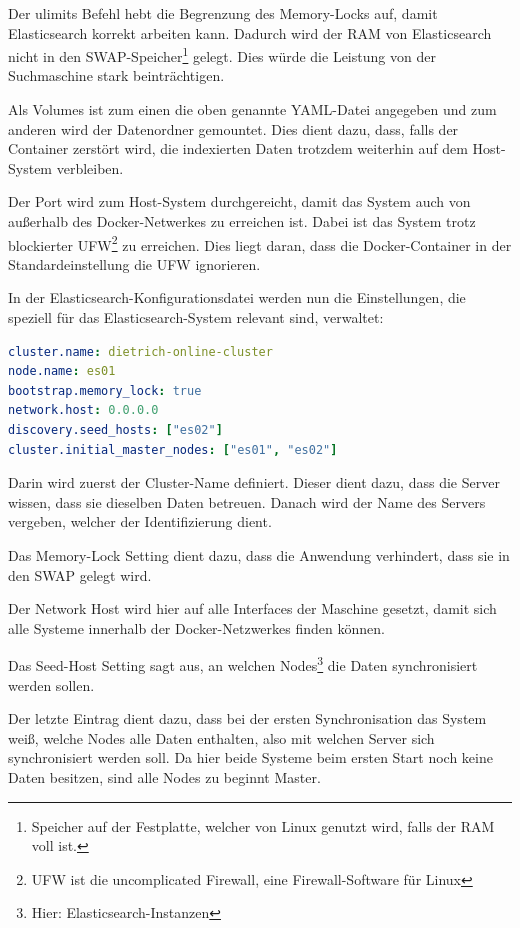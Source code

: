 Der ulimits Befehl hebt die Begrenzung des Memory-Locks auf, damit Elasticsearch korrekt arbeiten kann. Dadurch wird der RAM von Elasticsearch nicht in den SWAP-Speicher\footnote{Speicher auf der Festplatte, welcher von Linux genutzt wird, falls der RAM voll ist.} gelegt. Dies würde die Leistung von der Suchmaschine stark beinträchtigen.

Als Volumes ist zum einen die oben genannte YAML-Datei angegeben und zum anderen wird der Datenordner gemountet. Dies dient dazu, dass, falls der Container zerstört wird, die indexierten Daten trotzdem weiterhin auf dem Host-System verbleiben.

Der Port wird zum Host-System durchgereicht, damit das System auch von außerhalb des Docker-Netwerkes zu erreichen ist. Dabei ist das System trotz blockierter UFW\footnote{UFW ist die uncomplicated Firewall, eine Firewall-Software für Linux} zu erreichen. Dies liegt daran, dass die Docker-Container in der Standardeinstellung die UFW ignorieren.

In der Elasticsearch-Konfigurationsdatei werden nun die Einstellungen, die speziell für das Elasticsearch-System relevant sind, verwaltet: 

\begin{lstlisting}[language=YAML, frame=single, label={lst:es01-yml}, caption=Auschnitt aus der Konfigurationsdatei von Elasticsearch,captionpos=b] 
cluster.name: dietrich-online-cluster
node.name: es01
bootstrap.memory_lock: true
network.host: 0.0.0.0
discovery.seed_hosts: ["es02"]
cluster.initial_master_nodes: ["es01", "es02"]
\end{lstlisting}

Darin wird zuerst der Cluster-Name definiert. Dieser dient dazu, dass die Server wissen, dass sie dieselben Daten betreuen. 
Danach wird der Name des Servers vergeben, welcher der Identifizierung dient.

Das Memory-Lock Setting dient dazu, dass die Anwendung verhindert, dass sie in den SWAP gelegt wird.

Der Network Host wird hier auf alle Interfaces der Maschine gesetzt, damit sich alle Systeme innerhalb der Docker-Netzwerkes finden können.

Das Seed-Host Setting sagt aus, an welchen Nodes\footnote{Hier: Elasticsearch-Instanzen} die Daten synchronisiert werden sollen.

Der letzte Eintrag dient dazu, dass bei der ersten Synchronisation das System weiß, welche Nodes alle Daten enthalten, also mit welchen Server sich synchronisiert werden soll. Da hier beide Systeme beim ersten Start noch keine Daten besitzen, sind alle Nodes zu beginnt Master. \cite{ElasticsearchB.V..13.2.2020}


